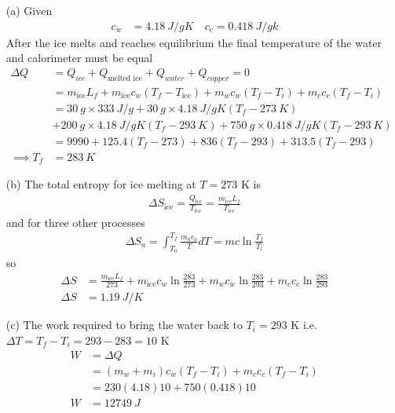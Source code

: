 \documentclass[../main.tex]{subfiles}
\begin{document}
\begin{itemize}
    \item [(a)] Given
    \begin{align*}
        c_w &= \qty{4.18}{J/gK} \quad c_c = \qty{0.418}{J/gk} 
    \end{align*}
    After the ice melts and reaches equilibrium the final temperature of the water and calorimeter must be equal
    \begin{align*}
        \Delta Q &= Q_{ice} + Q_\text{melted ice} + Q_{water} + Q_{copper} = 0 \\
        &= m_\text{ice} L_f + m_\text{ice} c_w (T_f - T_\text{ice}) + m_w c_w (T_f - T_i) + m_c c_c (T_f - T_i) \\
        &= \qty{30}{g} \times \qty{333}{J/g} + \qty{30}{g} \times \qty{4.18}{J/gK} (T_f - \qty{273}{K}) \\
            &+ \qty{200}{g} \times \qty{4.18}{J/gK} (T_f - \qty{293}{K}) + \qty{750}{g} \times \qty{0.418}{J/gK} (T_f - \qty{293}{K}) \\
        &= 9990 + 125.4 (T_f - 273) + 836 (T_f - 293) + 313.5 (T_f - 293) \\
        \implies T_f &= \qty{283}{K}
    \end{align*}
    \item [(b)] The total entropy for ice melting at $T = 273$ K is 
    \begin{align*}
        \Delta S_\text{ice} = \frac{Q_\text{ice}}{T_\text{ice}} = \frac{m_\text{ice} L_f}{T_\text{ice}}
    \end{align*}
    and for three other processes
    \begin{align*}
        \Delta S_a = \int_{T_0}^{T_f} \frac{m_a c_a}{T} dT = mc \ln \frac{T_f}{T_i}
    \end{align*}
    so
    \begin{align*}
        \Delta S &= \frac{m_\text{ice} L_f}{273} + m_\text{ice} c_w \ln \frac{283}{273} + m_w c_w \ln \frac{283}{293} + m_c c_c \ln \frac{283}{293} \\
        \Delta S &= \qty{1.19}{J/K}
    \end{align*}
    \item [(c)] The work required to bring the water back to $T_i = 293$ K i.e. $\Delta T = T_f - T_i = 293 - 283 = 10$ K
    \begin{align*}
        W &= \Delta Q \\
        &= (m_w + m_i) c_w (T_f - T_i) + m_c c_c (T_f - T_i) \\
        &= 230 (4.18) 10 + 750 (0.418) 10 \\
        W &= \qty{12749}{J}
    \end{align*}
\end{itemize}
\end{document}
